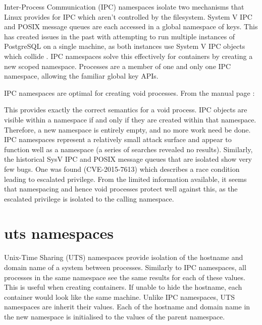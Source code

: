 \documentclass[12pt,a4paper,twoside]{report}
\begin{document}
Inter-Process Communication (IPC) namespaces isolate two mechanisms that Linux provides for IPC which aren't controlled by the filesystem. System V IPC and POSIX message queues are each accessed in a global namespace of keys. This has created issues in the past with attempting to run multiple instances of PostgreSQL on a single machine, as both instances use System V IPC objects which collide \citep[§4.3]{barham_xen_2003}. IPC namespaces solve this effectively for containers by creating a new scoped namespace. Processes are a member of one and only one IPC namespace, allowing the familiar global key APIs.

IPC namespaces are optimal for creating void processes. From the manual page \citep{free_software_foundation_ipc_namespaces7_2021}:


This provides exactly the correct semantics for a void process. IPC objects are visible within a namespace if and only if they are created within that namespace. Therefore, a new namespace is entirely empty, and no more work need be done. IPC namespaces represent a relatively small attack surface and appear to function well as a namespace (a series of searches revealed no results). Similarly, the historical SysV IPC and POSIX message queues that are isolated show very few bugs. One was found (CVE-2015-7613) which describes a race condition leading to escalated privilege. From the limited information available, it seems that namespacing and hence void processes protect well against this, as the escalated privilege is isolated to the calling namespace.

\section{uts namespaces}
\label{sec:voiding-uts}

Unix-Time Sharing (UTS) namespaces provide isolation of the hostname and domain name of a system between processes. Similarly to IPC namespaces, all processes in the same namespace see the same results for each of these values. This is useful when creating containers. If unable to hide the hostname, each container would look like the same machine. Unlike IPC namespaces, UTS namespaces are inherit their values. Each of the hostname and domain name in the new namespace is initialised to the values of the parent namespace.
\end{document}
